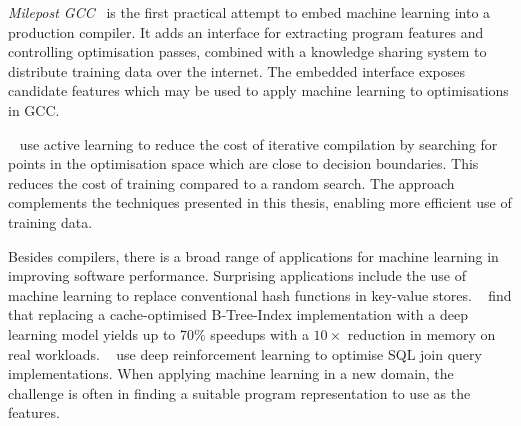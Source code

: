 


\emph{Milepost GCC}~\cite{Fursin2011} is the first practical attempt to embed machine learning into a production compiler. It adds an interface for extracting program features and controlling optimisation passes, combined with a knowledge sharing system to distribute training data over the internet. The embedded interface exposes candidate features which may be used to apply machine learning to optimisations in GCC.

\citeauthor{Ogilvie2017}~\cite{Ogilvie2017} use active learning to reduce the cost of iterative compilation by searching for points in the optimisation space which are close to decision boundaries. This reduces the cost of training compared to a random search. The approach complements the techniques presented in this thesis, enabling more efficient use of training data.

Besides compilers, there is a broad range of applications for machine learning in improving software performance.
Surprising applications include the use of machine learning to replace conventional hash functions in key-value stores. \citeauthor{Kraska2017}~\cite{Kraska2017} find that replacing a cache-optimised B-Tree-Index implementation with a deep learning model yields up to 70\% speedups with a $10\times$ reduction in memory on real workloads.
\citeauthor{Krishnan2018}~\cite{Krishnan2018} use deep reinforcement learning to optimise SQL join query implementations. %
When applying machine learning in a new domain, the challenge is often in finding a suitable program representation to use as the features.


